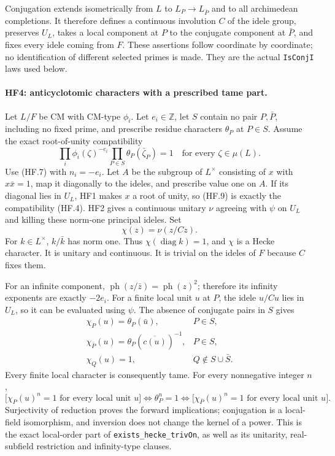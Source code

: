 Conjugation extends isometrically from $L$ to
$L_P\to L_{\bar P}$ and to all archimedean completions.
It therefore defines a continuous involution $C$ of the
idele group, preserves $U_L$, takes a local component at $P$
to the conjugate component at $\bar P$, and fixes every
idele coming from $F$. These assertions follow coordinate by
coordinate; no identification of different selected primes is
made. They are the actual \texttt{IsConjI} laws used below.

\paragraph{HF4: anticyclotomic characters with a prescribed tame part.}
Let $L/F$ be CM with CM-type $\phi_i$. Let $e_i\in\mathbb Z$,
let $S$ contain no pair $P,\bar P$, including no fixed prime,
and prescribe residue characters $\theta_P$ at $P\in S$.
Assume the exact root-of-unity compatibility
\[
 \prod_i\phi_i(\zeta)^{-e_i}
       \prod_{P\in S}\theta_P(\bar\zeta_P)=1
                 \quad\text{for every }\zeta\in\mu(L).
 \tag{HF.9}
\]
Use (HF.7) with $n_i=-e_i$. Let $A$ be the subgroup of
$L^\times$ consisting of $x$ with $x\bar x=1$, map it
diagonally to the ideles, and prescribe value one on $A$.
If its diagonal lies in $U_L$, HF1 makes $x$ a root of
unity, so (HF.9) is exactly the compatibility (HF.4).
HF2 gives a continuous unitary $\nu$ agreeing with $\psi$
on $U_L$ and killing these norm-one principal ideles. Set
\[
                    \chi(z)=\nu(z/Cz).               \tag{HF.10}
\]
For $k\in L^\times$, $k/\bar k$ has norm one. Thus
$\chi(\operatorname{diag}k)=1$, and $\chi$ is a Hecke
character. It is unitary and continuous. It is trivial
on the ideles of $F$ because $C$ fixes them.

For an infinite component,
$\operatorname{ph}(z/\bar z)=\operatorname{ph}(z)^2$;
therefore its infinity exponents are exactly $-2e_i$.
For a finite local unit $u$ at $P$, the idele
$u/Cu$ lies in $U_L$, so it can be evaluated using $\psi$.
The absence of conjugate pairs in $S$ gives
\[
 \begin{array}{ll}
  \chi_P(u)=\theta_P(\bar u),
                         &P\in S,\\
  \chi_{\bar P}(u)=
       \theta_P(\overline{c(u)})^{-1},
                         &P\in S,\\
  \chi_Q(u)=1,             &Q\notin S\cup\bar S.
 \end{array}                                                \tag{HF.11}
\]
Every finite local character is consequently tame.
For every nonnegative integer $n$,
\[
 \bigl[\chi_P(u)^n=1\text{ for every local unit }u\bigr]
   \Longleftrightarrow \theta_P^n=1
   \Longleftrightarrow
 \bigl[\chi_{\bar P}(u)^n=1\text{ for every local unit }u\bigr].
 \tag{HF.12}
\]
Surjectivity of reduction proves the forward implications;
conjugation is a local-field isomorphism, and inversion does
not change the kernel of a power. This is the exact local-order
part of \texttt{exists\_hecke\_trivOn}, as well as its
unitarity, real-subfield restriction and infinity-type clauses.

